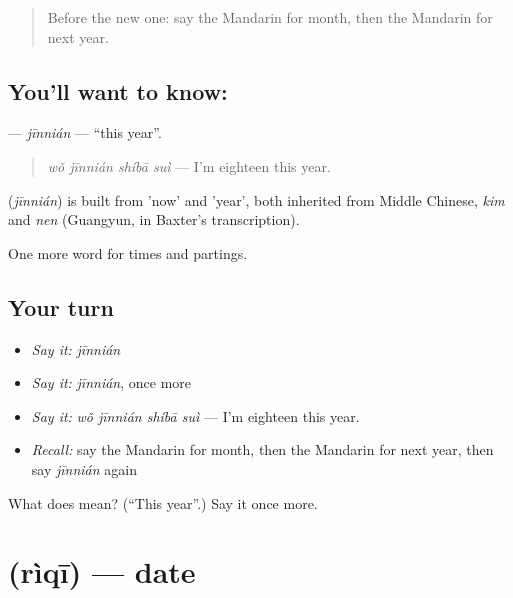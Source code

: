 \begin{quote}
Before the new one: say the Mandarin for month, then the Mandarin for next year.
\end{quote}

\subsection*{You'll want to know: }
\textbf{} — \emph{jīnnián} — \textquotedblleft{}this year\textquotedblright{}.

\begin{quote}
\textbf{} \emph{wǒ jīnnián shíbā suì} — I'm eighteen this year.
\end{quote}

\begin{cousinweb}
\textbf{} (\emph{jīnnián}) is built from  'now' and  'year', both inherited from Middle Chinese, \emph{kim} and \emph{nen} (Guangyun, in Baxter's transcription).
\end{cousinweb}

\begin{grammarlens}[title={What you've built}]
One more word for times and partings.
\end{grammarlens}

\subsection*{Your turn}
\begin{itemize}
\raggedright
  \item \emph{Say it:} \emph{jīnnián}
  \item \emph{Say it:} \emph{jīnnián}, once more
  \item \emph{Say it:} \emph{wǒ jīnnián shíbā suì} — I'm eighteen this year.
  \item \emph{Recall:} say the Mandarin for month, then the Mandarin for next year, then say \emph{jīnnián} again
\end{itemize}

\begin{tcolorbox}[breakable,colback=teal!4,colframe=teal!35!black,title={Before you move on}]
What does  mean? (\textquotedblleft{}This year\textquotedblright{}.) Say it once more.
\end{tcolorbox}
\section[\texorpdfstring{\zh{日期} (rìqī)}{日期 (rìqī)}]{ (rìqī) — date}

